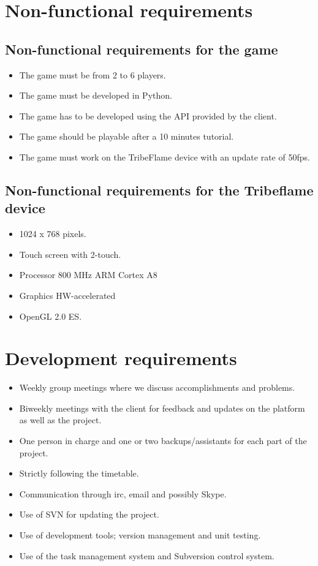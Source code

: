 \documentclass[12pt,a4paper]{article}
\begin{document}
\section{Non-functional requirements}

\subsection{Non-functional requirements for the game}

\begin{itemize}
\item The game must be from 2 to 6 players.
\item The game must be developed in Python.
\item The game has to be developed using the API provided by the client.
\item The game should be playable after a 10 minutes tutorial.
\item The game must work on the TribeFlame device with an update rate
  of 50fps.
\end{itemize}

\subsection{Non-functional requirements for the Tribeflame device}

\begin{itemize}
\item 1024 x 768 pixels.
\item Touch screen with 2-touch. 
\item Processor 800 MHz ARM Cortex A8
\item Graphics HW-accelerated
\item OpenGL 2.0 ES.
\end{itemize}

\section{Development requirements}

\begin{itemize}
\item Weekly group meetings where we discuss accomplishments and problems.
\item Biweekly meetings with the client for feedback and updates on
  the platform as well as the project.
\item One person in charge and one or two backups/assistants for each
  part of the project.
\item Strictly following the timetable.
\item Communication through irc, email and possibly Skype.
\item Use of SVN for updating the project.
\item Use of development tools; version management and unit testing.
\item Use of the task management system and Subversion control system.
\end{itemize}
\end{document}
